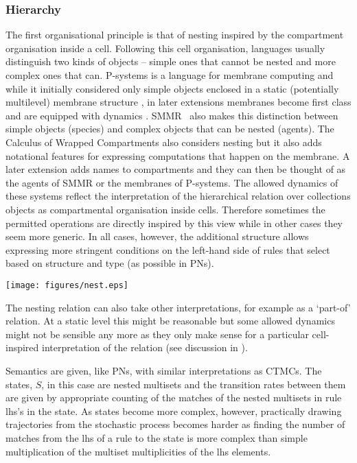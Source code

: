 \subsubsection*{Hierarchy}
The first organisational principle is that of nesting inspired by the
compartment organisation inside a cell. Following this cell organisation,
languages usually distinguish two kinds of objects -- simple ones that cannot be
nested and more complex ones that can. P-systems is a language for membrane
computing and while it initially considered only simple objects enclosed in a
static (potentially multilevel) membrane structure \citep{puaun2000computing},
in later extensions membranes become first class and are equipped with dynamics
\citep{puaun2001p}. SMMR~\citep{oury_multi-level_2013} also makes this
distinction between simple objects (species) and complex objects that can be
nested (agents). The Calculus of Wrapped Compartments \citep{coppo_stochastic}
also considers nesting but it also adds notational features for expressing
computations that happen on the membrane. A later extension
\citep{coppo_hybrid_2010} adds names to compartments and they can then be
thought of as the agents of SMMR or the membranes of P-systems. The allowed
dynamics of these systems reflect the interpretation of the hierarchical
relation over collections objects as compartmental organisation inside
cells. Therefore sometimes the permitted operations are directly inspired by
this view while in other cases they seem more generic. In all cases, however,
the additional structure allows expressing more stringent conditions on the
left-hand side of rules that select based on structure and type (as possible in
PNs).
\begin{center}
    \texttt{[image: figures/nest.eps]}
  \end{center}  
The nesting relation can also take other interpretations, for example as a
`part-of' relation. At a static level this might be reasonable but some 
allowed dynamics might not be sensible any more as they only make sense for a
particular cell-inspired interpretation of the relation (see discussion in
\citet{artale_part-whole_1996}).

Semantics are given, like PNs, with similar interpretations as CTMCs. The
states, $S$, in this case are nested multisets and the transition rates between
them are given by appropriate counting of the matches of the nested multisets in
rule lhs's in the state. As states become more complex, however, practically
drawing trajectories from the stochastic process becomes harder as finding the
number of matches from the lhs of a rule to the state is more complex than
simple multiplication of the multiset multiplicities of the lhs elements.

